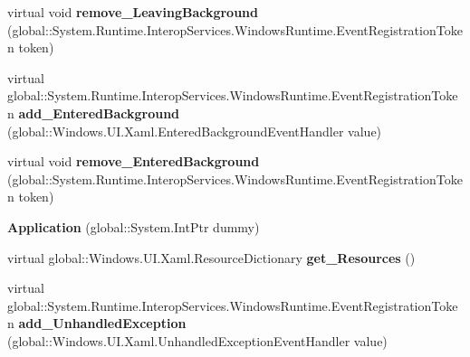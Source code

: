 \begin{DoxyCompactItemize}
\item 
\mbox{\label{class_windows_1_1_u_i_1_1_xaml_1_1_application_a33a3ccc165dd32a08e6cbc543ea18565}} 
virtual void {\bfseries remove\+\_\+\+Leaving\+Background} (global\+::\+System.\+Runtime.\+Interop\+Services.\+Windows\+Runtime.\+Event\+Registration\+Token token)
\item 
\mbox{\label{class_windows_1_1_u_i_1_1_xaml_1_1_application_a1ea6c3f747b180eb0e3d0485f1427ce1}} 
virtual global\+::\+System.\+Runtime.\+Interop\+Services.\+Windows\+Runtime.\+Event\+Registration\+Token {\bfseries add\+\_\+\+Entered\+Background} (global\+::\+Windows.\+U\+I.\+Xaml.\+Entered\+Background\+Event\+Handler value)
\item 
\mbox{\label{class_windows_1_1_u_i_1_1_xaml_1_1_application_a09062e367c18c1fcc02e683a68c8f793}} 
virtual void {\bfseries remove\+\_\+\+Entered\+Background} (global\+::\+System.\+Runtime.\+Interop\+Services.\+Windows\+Runtime.\+Event\+Registration\+Token token)
\item 
\mbox{\label{class_windows_1_1_u_i_1_1_xaml_1_1_application_a90eb3297ba9bfe5ad1c0d720af9b8066}} 
{\bfseries Application} (global\+::\+System.\+Int\+Ptr dummy)
\item 
\mbox{\label{class_windows_1_1_u_i_1_1_xaml_1_1_application_a34b9be50f5ce3d03d0f641d57ed74c72}} 
virtual global\+::\+Windows.\+U\+I.\+Xaml.\+Resource\+Dictionary {\bfseries get\+\_\+\+Resources} ()
\item 
\mbox{\label{class_windows_1_1_u_i_1_1_xaml_1_1_application_a3fdd0d36fb6e5880c92fd8b205ab9cda}} 
virtual global\+::\+System.\+Runtime.\+Interop\+Services.\+Windows\+Runtime.\+Event\+Registration\+Token {\bfseries add\+\_\+\+Unhandled\+Exception} (global\+::\+Windows.\+U\+I.\+Xaml.\+Unhandled\+Exception\+Event\+Handler value)
\item 
\mbox{\label{class_windows_1_1_u_i_1_1_xaml_1_1_application_ab4bbcd1b2fae8d35eae530ebe85732ba}} 

\end{DoxyCompactItemize}
